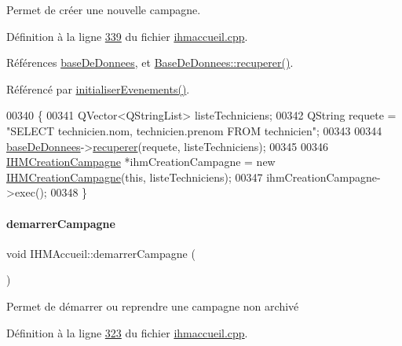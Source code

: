 Permet de créer une nouvelle campagne. 



Définition à la ligne \hyperlink{ihmaccueil_8cpp_source_l00339}{339} du fichier \hyperlink{ihmaccueil_8cpp_source}{ihmaccueil.\+cpp}.



Références \hyperlink{ihmaccueil_8h_source_l00040}{base\+De\+Donnees}, et \hyperlink{basededonnees_8cpp_source_l00139}{Base\+De\+Donnees\+::recuperer()}.



Référencé par \hyperlink{ihmaccueil_8cpp_source_l00084}{initialiser\+Evenements()}.


\begin{DoxyCode}
00340 \{
00341     QVector<QStringList> listeTechniciens;
00342     QString requete = \textcolor{stringliteral}{"SELECT technicien.nom, technicien.prenom FROM technicien"};
00343 
00344     \hyperlink{class_i_h_m_accueil_ab56d9846c071396a92f88272880e2c1f}{baseDeDonnees}->\hyperlink{class_base_de_donnees_a77539baad389f5acf754cd2cd452403e}{recuperer}(requete, listeTechniciens);
00345 
00346     \hyperlink{class_i_h_m_creation_campagne}{IHMCreationCampagne} *ihmCreationCampagne = \textcolor{keyword}{new} 
      \hyperlink{class_i_h_m_creation_campagne}{IHMCreationCampagne}(\textcolor{keyword}{this}, listeTechniciens);
00347     ihmCreationCampagne->exec();
00348 \}
\end{DoxyCode}
\mbox{\label{class_i_h_m_accueil_a6e8935ff4e0ba8f0c0015f370d91eda3}} 
\paragraph{\texorpdfstring{demarrer\+Campagne}{demarrerCampagne}}
{\footnotesize\ttfamily void I\+H\+M\+Accueil\+::demarrer\+Campagne (\begin{DoxyParamCaption}{ }\end{DoxyParamCaption})\hspace{0.3cm}{\ttfamily [slot]}}



Permet de démarrer ou reprendre une campagne non archivé 



Définition à la ligne \hyperlink{ihmaccueil_8cpp_source_l00323}{323} du fichier \hyperlink{ihmaccueil_8cpp_source}{ihmaccueil.\+cpp}.



